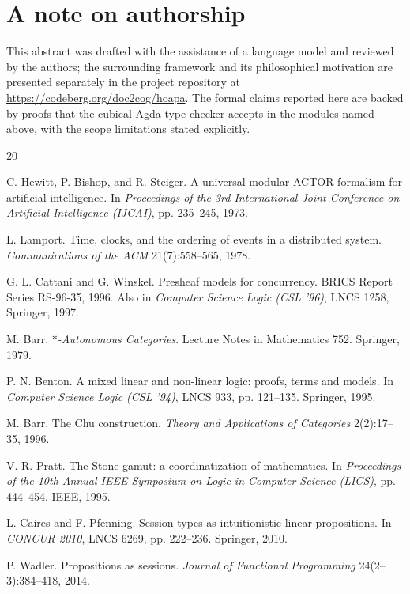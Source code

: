\documentclass[11pt]{article}
\begin{document}
\section*{A note on authorship}

This abstract was drafted with the assistance of a language model and reviewed
by the authors; the surrounding framework and its philosophical motivation are
presented separately in the project repository at
\url{https://codeberg.org/doc2cog/hoapa}. The formal claims reported here are
backed by proofs that the cubical Agda type-checker accepts in the modules named
above, with the scope limitations stated explicitly.

\begin{thebibliography}{20}
\raggedright

C. Hewitt, P. Bishop, and R. Steiger.
A universal modular ACTOR formalism for artificial intelligence.
In \emph{Proceedings of the 3rd International Joint Conference on Artificial
Intelligence (IJCAI)}, pp. 235--245, 1973.

L. Lamport.
Time, clocks, and the ordering of events in a distributed system.
\emph{Communications of the ACM} 21(7):558--565, 1978.

G. L. Cattani and G. Winskel.
Presheaf models for concurrency.
BRICS Report Series RS-96-35, 1996. Also in
\emph{Computer Science Logic (CSL '96)}, LNCS 1258, Springer, 1997.

M. Barr.
\emph{$*$-Autonomous Categories}.
Lecture Notes in Mathematics 752. Springer, 1979.

P. N. Benton.
A mixed linear and non-linear logic: proofs, terms and models.
In \emph{Computer Science Logic (CSL '94)}, LNCS 933, pp. 121--135. Springer,
1995.

M. Barr.
The Chu construction.
\emph{Theory and Applications of Categories} 2(2):17--35, 1996.

V. R. Pratt.
The Stone gamut: a coordinatization of mathematics.
In \emph{Proceedings of the 10th Annual IEEE Symposium on Logic in Computer
Science (LICS)}, pp. 444--454. IEEE, 1995.

L. Caires and F. Pfenning.
Session types as intuitionistic linear propositions.
In \emph{CONCUR 2010}, LNCS 6269, pp. 222--236. Springer, 2010.

P. Wadler.
Propositions as sessions.
\emph{Journal of Functional Programming} 24(2--3):384--418, 2014.


\end{thebibliography}
\end{document}
